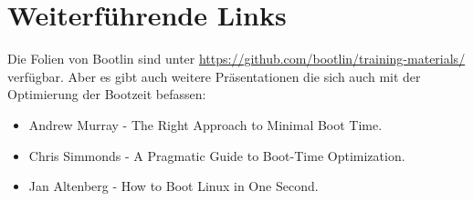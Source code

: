 
\section{Weiterführende Links}
Die Folien von Bootlin sind unter \url{https://github.com/bootlin/training-materials/} verfügbar. Aber es gibt
auch weitere Präsentationen die sich auch mit der Optimierung der Bootzeit befassen:
\begin{itemize}
	\item Andrew Murray - The Right Approach to Minimal Boot Time. \cite{andrewMurrayOpt}
	\item Chris Simmonds - A Pragmatic Guide to Boot-Time Optimization. \cite{chris-simmonds-boot-time-elce-2017_0}
	\item Jan Altenberg - How to Boot Linux in One Second. \cite{janAltenbergOpt}
\end{itemize}
